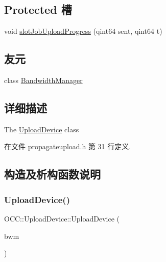 \subsection*{Protected 槽}
\begin{DoxyCompactItemize}
\item 
void \hyperlink{class_o_c_c_1_1_upload_device_a9ed332ee5b50c7841801b9ca882b5bf8}{slot\+Job\+Upload\+Progress} (qint64 sent, qint64 t)
\end{DoxyCompactItemize}
\subsection*{友元}
\begin{DoxyCompactItemize}
\item 
class \hyperlink{class_o_c_c_1_1_upload_device_af9c19747d2fb900e49cbed2d3650a35b}{Bandwidth\+Manager}
\end{DoxyCompactItemize}


\subsection{详细描述}
The \hyperlink{class_o_c_c_1_1_upload_device}{Upload\+Device} class 

在文件 propagateupload.\+h 第 31 行定义.



\subsection{构造及析构函数说明}
\mbox{\label{class_o_c_c_1_1_upload_device_adcb30f5e9e2572dae1a5b8fb33f18b6b}} 
\subsubsection{\texorpdfstring{Upload\+Device()}{UploadDevice()}}
{\footnotesize\ttfamily O\+C\+C\+::\+Upload\+Device\+::\+Upload\+Device (\begin{DoxyParamCaption}\item[{\hyperlink{class_o_c_c_1_1_bandwidth_manager}{Bandwidth\+Manager} $\ast$}]{bwm }\end{DoxyParamCaption})}



